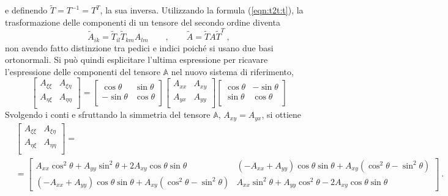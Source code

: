 e definendo $\tilde{T}=T^{-1}=T^T$, la sua inversa. Utilizzando la formula (\ref{eqn:t2t:t}), la trasformazione delle componenti di un tensore del secondo ordine diventa
\begin{equation}
    \tilde{A}_{ik} = \tilde{T}_{il} \tilde{T}_{km} A_{lm} \qquad , \qquad
    \tilde{A} = \tilde{T} A \tilde{T}^T \ ,
\end{equation}
non avendo fatto distinzione tra pedici e indici poiché si usano due basi ortonormali.
Si può quindi esplicitare l'ultima espressione per ricavare l'espressione delle componenti del tensore $\mathbb{A}$ nel nuovo sistema di riferimento,
 \begin{equation}
   \begin{bmatrix}
    A_{\xi \xi} & A_{\xi \eta} \\
    A_{\eta\xi} & A_{\eta\eta} \\
   \end{bmatrix} = 
   \begin{bmatrix} 
    \cos{\theta} & \sin{\theta} \\
   -\sin{\theta} & \cos{\theta} \\
   \end{bmatrix}
   \begin{bmatrix}
    A_{xx} & A_{xy} \\
    A_{yx} & A_{yy} \\
   \end{bmatrix}
   \begin{bmatrix} 
    \cos{\theta} &-\sin{\theta} \\
   \sin{\theta} & \cos{\theta} \\
   \end{bmatrix}
 \end{equation}
Svolgendo i conti e sfruttando la simmetria del tensore $\mathbb{A}$, $A_{xy} = A_{yx}$, si ottiene
  \begin{equation}
  \begin{aligned}
& \begin{bmatrix}
    A_{\xi \xi} & A_{\xi \eta} \\
    A_{\eta\xi} & A_{\eta\eta} \\
   \end{bmatrix} = \\ 
   & = \begin{bmatrix}
    A_{xx} \cos^2 \theta + A_{yy} \sin^2 \theta + 2 A_{xy} \cos \theta \sin \theta & 
      (-A_{xx} + A_{yy}) \cos \theta \sin \theta + A_{xy} ( \cos^2 \theta - \sin^2 \theta) \\
  (-A_{xx} + A_{yy}) \cos \theta \sin \theta + A_{xy} ( \cos^2 \theta - \sin^2 \theta) &
      A_{xx} \sin^2 \theta + A_{yy} \cos^2 \theta - 2 A_{xy} \cos \theta \sin \theta 
   \end{bmatrix} \ .
 \end{aligned}
 \end{equation}

